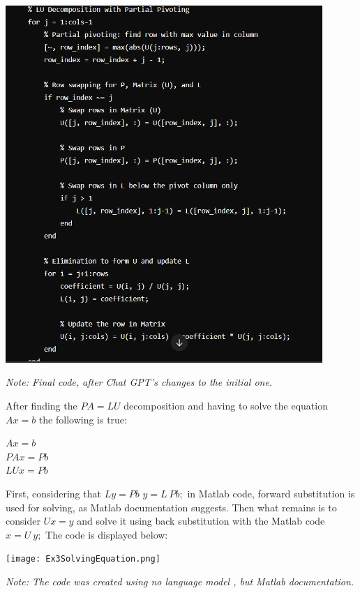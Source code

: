 \documentclass{article}
\begin{document}
\begin{tcolorbox}[colback=gray!10, colframe=gray!80, width=\textwidth, sharp corners]
    \centering 
    \includegraphics[width=0.9\textwidth,height=0.6\textheight]{PALUGPT.png} 
    

    \vspace{0.5cm} 
    
    \small\textit{Note: Final code, after Chat GPT's changes to the initial one.}
\end{tcolorbox}

After finding the $PA=LU$ decomposition and having to solve the equation $Ax= b$
the following is true:
\begin{center}
    $Ax = b$\\
    $PAx = Pb$\\
   $ LUx = Pb$\\
\end{center}
First, considering that $Ly=Pb$  $y = L \ Pb;$ in Matlab code, forward substitution is used for solving, as Matlab documentation suggests.
Then what remains is to consider $Ux=y$ and solve it using back substitution with the Matlab code $x = U \ y;$
The code is displayed below:

\begin{tcolorbox}[colback=gray!10, colframe=gray!80, width=\textwidth, sharp corners]
    \centering 
    \texttt{[image: Ex3SolvingEquation.png]} 
    

    \vspace{0.2cm} 
    
    \small\textit{Note: The code was created using no language model , but Matlab documentation.}
\end{tcolorbox}
\end{document}
